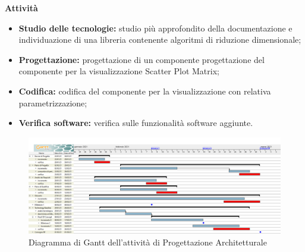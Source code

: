 \textbf{Attività}			

\begin{itemize}

\item \textbf{Studio delle tecnologie:} studio più approfondito della documentazione e individuazione di una libreria contenente algoritmi di riduzione dimensionale;
\item \textbf{Progettazione:} progettazione di un componente progettazione del componente per la visualizzazione Scatter Plot Matrix;
\item \textbf{Codifica:} codifica del componente per la visualizzazione con relativa parametrizzazione;
\item \textbf{Verifica software:} verifica sulle funzionalità software aggiunte.
\end{itemize}

\begin{landscape}

\begin{figure}[h]
	\centering	
	\includegraphics[width=\linewidth]{Images/GanttPianificazioneProgettazioneArchitetturale.PNG}
	\caption{Diagramma di Gantt dell'attività di Progettazione Architetturale}
\end{figure}

\end{landscape}




